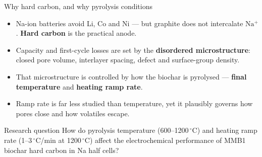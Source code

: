 \begin{frame}{Why hard carbon, and why pyrolysis conditions}
  \begin{itemize}
    \item Na-ion batteries avoid Li, Co and Ni --- but graphite does not intercalate
          \(\mathrm{Na^+}\). \textbf{Hard carbon} is the practical anode.
    \item Capacity and first-cycle losses are set by the \textbf{disordered microstructure}:
          closed pore volume, interlayer spacing, defect and surface-group density.
    \item That microstructure is controlled by how the biochar is pyrolysed ---
          \textbf{final temperature} and \textbf{heating ramp rate}.
    \item Ramp rate is far less studied than temperature, yet it plausibly governs
          how pores close and how volatiles escape.
  \end{itemize}
  \vspace{0.4em}
  \begin{block}{Research question}
    \small
    How do pyrolysis temperature (600--1200\,\({^\circ}\)C) and heating ramp rate
    (1--3\,\({^\circ}\)C/min at 1200\,\({^\circ}\)C) affect the electrochemical
    performance of MMB1 biochar hard carbon in Na half cells?
  \end{block}
\end{frame}

